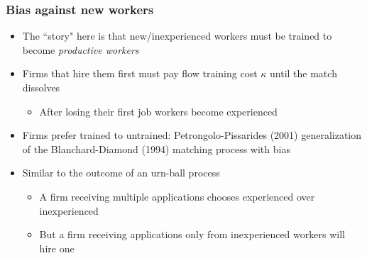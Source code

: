 \documentclass[9pt,xcolor={svgnames}]{beamer}
\begin{document}
\begin{frame}

\frametitle{Bias against new workers}

\begin{itemize}

\setlength\itemsep{1.8em}


\item The ``story" here is that new/inexperienced workers must be trained to become \textit{productive workers} 




\item Firms that hire them first must pay flow training cost $\kappa$ until the match dissolves  
\begin{itemize}
\smallskip
  \item After losing their first job workers become experienced    
\end{itemize}


\item Firms prefer trained to untrained: Petrongolo-Pissarides (2001) generalization of the Blanchard-Diamond (1994) matching process with bias  

\item Similar to the outcome of an urn-ball process  
    \begin{itemize}

\smallskip

\item A firm receiving multiple applications chooses experienced over inexperienced

\smallskip

\item But a firm receiving applications only from inexperienced workers will hire one

    \end{itemize}



\end{itemize}


\end{frame}
\end{document}
